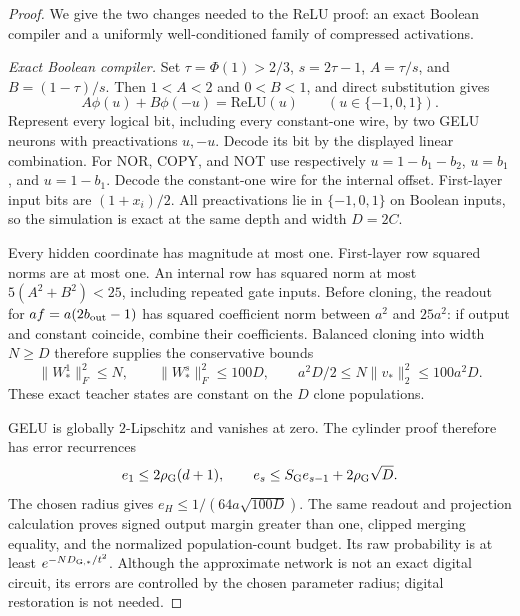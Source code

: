 \documentclass[11pt]{article}
\newcommand{\relu}{\mathrm{ReLU}}
\begin{document}
\begin{proof}
We give the two changes needed to the ReLU proof: an exact Boolean
compiler and a uniformly well-conditioned family of compressed
activations.

\emph{Exact Boolean compiler.}
Set $\tau=\Phi(1)>2/3$, $s=2\tau-1$, $A=\tau/s$, and
$B=(1-\tau)/s$. Then $1<A<2$ and $0<B<1$, and direct substitution gives
\[
 A\phi(u)+B\phi(-u)=\relu(u)\qquad(u\in\{-1,0,1\}).
\]
Represent every logical bit, including every constant-one wire, by two
GELU neurons with preactivations $u,-u$. Decode its bit by the displayed
linear combination. For NOR, COPY, and NOT use respectively
$u=1-b_1-b_2$, $u=b_1$, and $u=1-b_1$. Decode the constant-one wire
for the internal offset. First-layer input bits are $(1+x_i)/2$.
All preactivations lie in $\{-1,0,1\}$ on Boolean inputs, so the
simulation is exact at the same depth and width $D=2C$.

Every hidden coordinate has magnitude at most one. First-layer row
squared norms are at most one. An internal row has squared norm at
most $5(A^2+B^2)<25$, including repeated gate inputs. Before cloning,
the readout for $af=a(2b_{\rm out}-1)$ has squared coefficient norm
between $a^2$ and $25a^2$: if output and constant coincide, combine
their coefficients. Balanced cloning into width $N\ge D$ therefore
supplies the conservative bounds
\[
 \|W_*^1\|_F^2\le N,\qquad
 \|W_*^s\|_F^2\le100D,\qquad
 a^2D/2\le N\|v_*\|_2^2\le100a^2D.
\]
These exact teacher states are constant on the $D$ clone populations.

GELU is globally $2$-Lipschitz and vanishes at zero. The cylinder proof
therefore has error recurrences
\[
 e_1\le2\rho_{\rm G}(d+1),\qquad
 e_s\le S_{\rm G}e_{s-1}+2\rho_{\rm G}\sqrt D.
\]
The chosen radius gives $e_H\le1/(64a\sqrt{100D})$. The same readout
and projection calculation proves signed output margin greater than
one, clipped merging equality, and the normalized population-count
budget. Its raw probability is at least $e^{-ND_{\rm G,*}/t^2}$.
Although the approximate network is not an exact digital circuit,
its errors are controlled by the chosen parameter radius; digital
restoration is not needed.


\end{proof}
\end{document}
